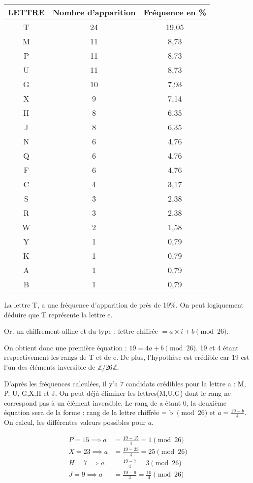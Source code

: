 \documentclass[a4paper,10pt]{article}
\newcommand{\Z}{\mathbb{Z}}
\begin{document}
\begin{enumerate}
\begin{center}
	\begin{tabular}{|c|c|c|}
	\hline 
	LETTRE & Nombre d'apparition & Fréquence en \% \\ 
	\hline 
	T & 24 & 19,05 \\ 
	\hline 
	M & 11 & 8,73 \\ 
	\hline 
	P & 11 & 8,73 \\ 
	\hline 
	U& 11 & 8,73 \\ 
	\hline 
	G	&10	&7,93\\ 
	\hline 
	X	&9	& 7,14\\ 
	\hline 
	H	&8	& 6,35\\ 
	\hline 
	J & 8 & 6,35 \\ 
	\hline 
	N & 6 & 4,76	 \\ 
	\hline 
	Q	&6	& 4,76\\ 
	\hline 
	F	&6	& 4,76\\ 
	\hline 
	C	&4	& 3,17\\ 
	\hline 
	S	&3	& 2,38\\ 
	\hline 
	R	&3	& 2,38\\ 
	\hline 
	W	&2	& 1,58\\ 
	\hline 
	Y	&1	& 0,79\\ 
	\hline 
	K	&1	& 0,79\\ 
	\hline 
	A	&1	& 0,79\\ 
	\hline 
	B	& 1	&0,79\\ 
	\hline 
	
	\end{tabular} 	
\end{center}
La lettre T, a une fréquence d'apparition de près de 19\%. On peut logiquement déduire que T représente la lettre e.

Or, un chiffrement affine et du type : lettre chiffrée $= a\times i + b \pmod{26}$.

On obtient donc une première équation : $19=4a+b \pmod{26}$. 19 et 4 étant respectivement les rangs de T et de e. De plus, l'hypothèse est crédible car 19 est l'un des éléments inversible de $\Z/26\Z$.

D'après les fréquences calculées, il y'a 7 candidats crédibles pour la lettre a : M, P, U, G,X,H et J. On peut déjà éliminer les lettres(M,U,G) dont le rang ne correspond pas à un élément inversible.
Le rang de a étant 0, la deuxième équation sera de la forme : rang de la lettre chiffrée = b $\pmod{26}$ et $a=\frac{19-b}{4}$. On calcul, les différentes valeurs possibles pour $a$.

\begin{align}
 P=15 \implies a&=\frac{19-15}{4}=1\pmod{26}\\
 X=23 \implies a&=\frac{19-23}{4}=25\pmod{26}\\
 H=7 \implies a&=\frac{19-7}{4}=3\pmod{26}\\
 J=9 \implies a&=\frac{19-9}{4}=\frac{10}{4}\pmod{26}
\end{align}


\end{enumerate}
\end{document}
